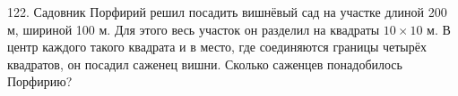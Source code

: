 122. Садовник Порфирий решил посадить вишнёвый сад на участке длиной 200 м, шириной 100 м. Для этого весь участок он разделил на квадраты $10\times10$ м. В центр каждого такого квадрата и в место, где соединяются границы четырёх квадратов, он посадил саженец вишни. Сколько саженцев понадобилось Порфирию?\\

